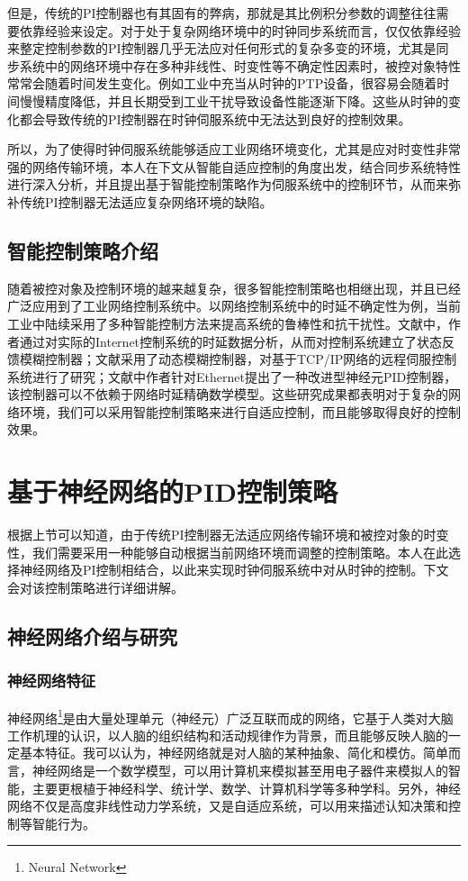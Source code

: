 但是，传统的PI控制器也有其固有的弊病，那就是其比例积分参数的调整往往需要依靠经验来设定。对于处于复杂网络环境中的时钟同步系统而言，仅仅依靠经验来整定控制参数的PI控制器几乎无法应对任何形式的复杂多变的环境，尤其是同步系统中的网络环境中存在多种非线性、时变性等不确定性因素时，被控对象特性常常会随着时间发生变化。例如工业中充当从时钟的PTP设备，很容易会随着时间慢慢精度降低，并且长期受到工业干扰导致设备性能逐渐下降。这些从时钟的变化都会导致传统的PI控制器在时钟伺服系统中无法达到良好的控制效果。

所以，为了使得时钟伺服系统能够适应工业网络环境变化，尤其是应对时变性非常强的网络传输环境，本人在下文从智能自适应控制的角度出发，结合同步系统特性进行深入分析，并且提出基于智能控制策略作为伺服系统中的控制环节，从而来弥补传统PI控制器无法适应复杂网络环境的缺陷。

\subsection{智能控制策略介绍}
随着被控对象及控制环境的越来越复杂，很多智能控制策略也相继出现，并且已经广泛应用到了工业网络控制系统中。以网络控制系统中的时延不确定性为例，当前工业中陆续采用了多种智能控制方法来提高系统的鲁棒性和抗干扰性\supercite{19,20}。文献\parencite{21}中，作者通过对实际的Internet控制系统的时延数据分析，从而对控制系统建立了状态反馈模糊控制器；文献\parencite{22}采用了动态模糊控制器，对基于TCP/IP网络的远程伺服控制系统进行了研究；文献\parencite{23}中作者针对Ethernet提出了一种改进型神经元PID控制器，该控制器可以不依赖于网络时延精确数学模型。这些研究成果都表明对于复杂的网络环境，我们可以采用智能控制策略来进行自适应控制，而且能够取得良好的控制效果。

\section{基于神经网络的PID控制策略}
根据上节可以知道，由于传统PI控制器无法适应网络传输环境和被控对象的时变性，我们需要采用一种能够自动根据当前网络环境而调整的控制策略。本人在此选择神经网络及PI控制相结合，以此来实现时钟伺服系统中对从时钟的控制。下文会对该控制策略进行详细讲解。

\subsection{神经网络介绍与研究}
\subsubsection{神经网络特征}
神经网络\footnote{Neural Network}是由大量处理单元（神经元）广泛互联而成的网络，它基于人类对大脑工作机理的认识，以人脑的组织结构和活动规律作为背景，而且能够反映人脑的一定基本特征。我可以认为，神经网络就是对人脑的某种抽象、简化和模仿。简单而言，神经网络是一个数学模型，可以用计算机来模拟甚至用电子器件来模拟人的智能，主要更根植于神经科学、统计学、数学、计算机科学等多种学科。另外，神经网络不仅是高度非线性动力学系统，又是自适应系统，可以用来描述认知决策和控制等智能行为。

